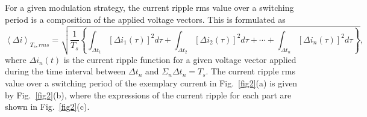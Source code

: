 \documentclass[10pt, onecolumn,conference]{IEEEtran}
\begin{document}

For a given modulation strategy, the current ripple rms value over a switching period is a composition of the applied voltage vectors. This is formulated as
%
\begin{equation}
\left\langle \Delta i \right\rangle_{T_s,rms}=\sqrt{\dfrac{1}{T_s} \left\{ \int_{\Delta t_1}[\Delta i_{1}(\tau)]^2 d\tau+ \int_{\Delta t_2} [\Delta i_{2}(\tau)]^2 d\tau +  \cdots + \int_{\Delta t_n} [\Delta i_{n}(\tau)]^2 d\tau \right\}},
\end{equation} where $\Delta i_n(t)$ is the current ripple function for a given voltage vector applied during the time interval between $\Delta t_n$ and $\Sigma_n{\Delta t_n}\!=\!T_s$. The current ripple rms value over a switching period of the exemplary current in Fig.~\ref{fig2}(a) is given by Fig.~\ref{fig2}(b), where the expressions of the current ripple for each part are shown in Fig.~\ref{fig2}(c).
\end{document}
